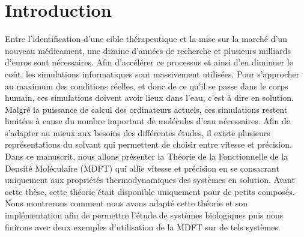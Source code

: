 \chapter{Introduction}

Entre l'identification d'une cible thérapeutique et la mise sur la marché d'un nouveau médicament, une dizaine d'années de recherche et plusieurs milliards d’euros sont nécessaires. Afin d'accélérer ce processus et ainsi d'en diminuer le coût, les simulations informatiques sont massivement utilisées. Pour s'approcher au maximum des conditions réelles, et donc de ce qu'il se passe dans le corps humain, ces simulations doivent avoir lieux dans l'eau, c'est à dire en solution. Malgré la puissance de calcul des ordinateurs actuels, ces simulations restent limitées à cause du nombre important de molécules d'eau nécessaires. Afin de s'adapter au mieux aux besoins des différentes études, il existe plusieurs représentations du solvant qui permettent de choisir entre vitesse et précision. Dans ce manuscrit, nous allons présenter la Théorie de la Fonctionnelle de la Densité Moléculaire (MDFT) qui allie vitesse et précision en se consacrant uniquement aux propriétés thermodynamiques des systèmes en solution. Avant cette thèse, cette théorie était disponible uniquement pour de petits composés. Nous montrerons comment nous avons adapté cette théorie et son implémentation afin de permettre l'étude de systèmes biologiques puis nous finirons avec deux exemples d'utilisation de la MDFT sur de tels systèmes.




